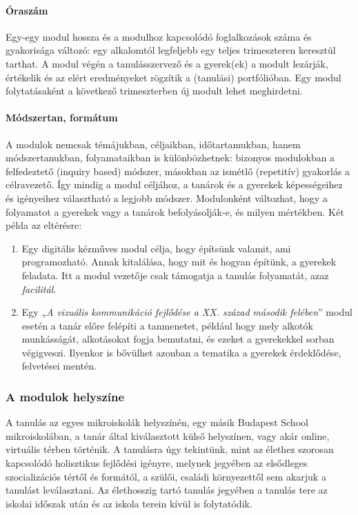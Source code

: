 \paragraph{Óraszám} Egy-egy modul hossza és a modulhoz kapcsolódó foglalkozások száma és gyakorisága változó: egy alkalomtól legfeljebb egy teljes trimeszteren keresztül tarthat. A modul végén a tanulásszervező és a gyerek(ek) a modult lezárják, értékelik és az elért eredményeket rögzítik a (tanulási) portfólióban. Egy modul folytatásaként a következő trimeszterben új modult lehet meghirdetni.

\paragraph{Módszertan, formátum} A modulok nemcsak témájukban,
céljaikban,\linebreak
időtartamukban, hanem módszertanukban, folyamataikban is különbözhetnek: bizonyos modulokban a felfedeztető (inquiry based) módszer, másokban az ismétlő (repetitív) gyakorlás a célravezető. Így mindig a modul céljához, a tanárok és a gyerekek képességeihez és igényeihez választható a legjobb módszer. Modulonként változhat, hogy a folyamatot a gyerekek vagy a tanárok befolyásolják-e, és milyen mértékben. Két példa az eltérésre:

\begin{enumerate}
      \item Egy digitális kézműves modul célja, hogy építsünk valamit,
        ami\linebreak
        programozható. Annak kitalálása, hogy mit és hogyan építünk, a gyerekek feladata. Itt a modul vezetője csak támogatja a tanulás folyamatát, azaz \emph{facilitál}.

      \item Egy „\emph{A vizuális kommunikáció fejlődése a XX. század második felében}'' modul esetén a tanár előre felépíti a tanmenetet, például hogy mely alkotók munkásságát, alkotásokat fogja bemutatni, és ezeket a gyerekekkel sorban végigveszi. Ilyenkor is bővülhet azonban a tematika a gyerekek érdeklődése, felvetései mentén.

\end{enumerate}



\subsubsection{A modulok helyszíne}

A tanulás az egyes mikroiskolák helyszínén, egy másik Budapest School mikroiskolában, a tanár által kiválasztott külső helyszínen, vagy akár online, virtuális térben történik. A tanulásra úgy tekintünk, mint az élethez szorosan kapcsolódó holisztikus fejlődési igényre, melynek jegyében az elsődleges szocializációs tértől és formától, a szülői, családi környezettől sem akarjuk a tanulást leválasztani. Az élethosszig tartó tanulás jegyében a tanulás tere az iskolai időszak után és az iskola terein kívül is folytatódik.

